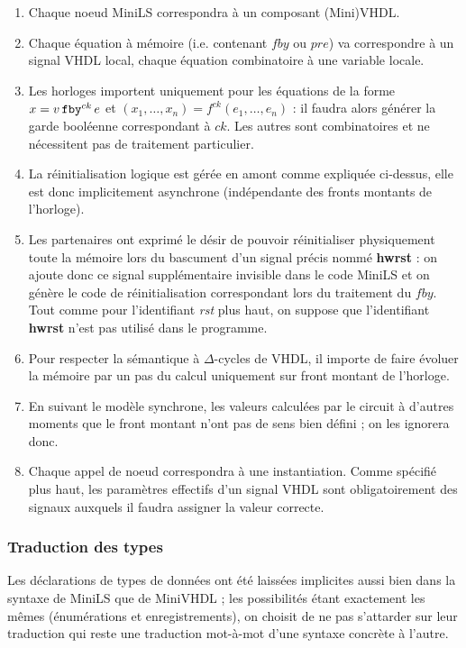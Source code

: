 \documentclass[a4paper]{article}
\newcommand{\mybox}[1]{\mbox{\tt{#1}}}
\newcommand{\Fby}[2]{#1 \, \mybox{fby}^{ck} \, #2}
\newcommand{\App}[2]{#1^{ck}(#2)}
\begin{document}
\begin{enumerate}
\item Chaque noeud MiniLS correspondra \`a un composant (Mini)VHDL.
\item Chaque \'equation \`a m\'emoire (i.e. contenant $fby$ ou $pre$) va correspondre
  \`a un signal VHDL local, chaque \'equation combinatoire \`a une variable locale.
\item Les horloges importent uniquement pour les \'equations de la forme $x =
  \Fby{v}{e}$ et $(x_1,\dots,x_n) = \App{f}{e_1,\dots,e_n}$ : il faudra alors
  g\'en\'erer la garde bool\'eenne correspondant \`a $ck$. Les autres sont combinatoires
  et ne n\'ecessitent pas de traitement particulier.
\item La r\'einitialisation logique est g\'er\'ee en amont comme expliqu\'ee ci-dessus,
  elle est donc implicitement asynchrone (ind\'ependante des fronts montants de
  l'horloge).
\item Les partenaires ont exprim\'e le d\'esir de pouvoir r\'einitialiser
  physiquement toute la m\'emoire lors du bascument d'un signal pr\'ecis
  nomm\'e \textbf{hwrst} : on ajoute donc ce signal suppl\'ementaire
  invisible dans le code MiniLS et on g\'en\`ere le code de
  r\'einitialisation correspondant lors du traitement du $fby$. Tout
  comme pour l'identifiant \textit{rst} plus haut, on suppose que
  l'identifiant \textbf{hwrst} n'est pas utilis\'e dans le programme.
\item Pour respecter la s\'emantique \`a $\Delta$-cycles de VHDL, il importe de
  faire \'evoluer la m\'emoire par un pas du calcul uniquement sur front montant de
  l'horloge.
\item En suivant le mod\`ele synchrone, les valeurs calcul\'ees par le circuit \`a
  d'autres moments que le front montant n'ont pas de sens bien d\'efini ; on les
  ignorera donc.
\item Chaque appel de noeud correspondra \`a une instantiation. Comme sp\'ecifi\'e
  plus haut, les param\`etres effectifs d'un signal VHDL sont obligatoirement des
  signaux auxquels il faudra assigner la valeur correcte.
\end{enumerate}

\subsubsection{Traduction des types}

Les d\'eclarations de types de donn\'ees ont \'et\'e laiss\'ees implicites aussi bien dans
la syntaxe de MiniLS que de MiniVHDL ; les possibilit\'es \'etant exactement les
m\^emes (\'enum\'erations et enregistrements), on choisit de ne pas s'attarder sur
leur traduction qui reste une traduction mot-\`a-mot d'une syntaxe concr\`ete \`a
l'autre.
\end{document}
